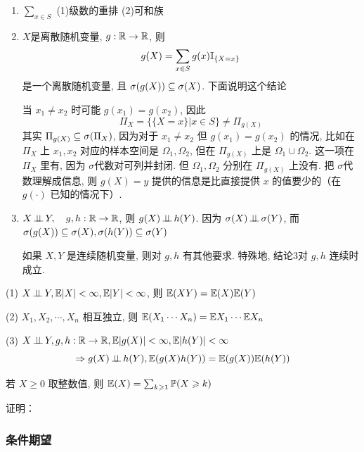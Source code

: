 \begin{remark}
    \quad 

    \begin{enumerate}
        \item $\sum_{x\in S}$ (1)级数的重排 (2)可和族
        \item $X$是离散随机变量, $g:\mathbb{R}\rightarrow\mathbb{R}$, 则 
        \[
        g(X)=\sum_{x\in S}g(x)\mathbb I_{\{X=x\}}
        \]
        是一个离散随机变量, 且 $\sigma(g(X))\subseteq \sigma(X)$. 下面说明这个结论

        当 $x_1\neq x_2$ 时可能 $g(x_1)=g(x_2)$, 因此
        \[
        \Pi_X=\{\{X=x\}|x\in S\}\neq \Pi_{g(X)}
        \]
        其实 $\Pi_{g(X)}\subseteq \sigma(\Pi_X)$, 因为对于 $x_1\neq x_2$ 但 $g(x_1)=g(x_2)$ 的情况, 比如在 $\Pi_X$ 上 $x_1,x_2$ 对应的样本空间是 $\Omega_1,\Omega_2$, 但在 $\Pi_{g(X)}$ 上是 $\Omega_1\cup \Omega_2$. 这一项在 $\Pi_X$ 里有, 因为 $\sigma$代数对可列并封闭. 但 $\Omega_1,\Omega_2$ 分别在 $\Pi_{g(X)}$ 上没有. 把 $\sigma$代数理解成信息, 则 $g(X)=y$ 提供的信息是比直接提供 $x$ 的值要少的（在 $g(\cdot)$ 已知的情况下）. 

        \item $X\operatorname{\perp\!\!\!\perp} Y,\quad g, h:\mathbb{R}\rightarrow \mathbb{R}$, 则 $g(X)\operatorname{\perp\!\!\!\perp} h(Y)$. 因为 $\sigma(X)\operatorname{\perp\!\!\!\perp} \sigma(Y)$, 而 $\sigma(g(X))\subseteq \sigma(X), \sigma(h(Y))\subseteq \sigma(Y)$
        
        如果 $X,Y$ 是连续随机变量, 则对 $g,h$ 有其他要求. 特殊地, 结论3对 $g,h$ 连续时成立. 
    \end{enumerate}
\end{remark}

\begin{theorem}
    (1) $X\operatorname{\perp\!\!\!\perp} Y, \mathbb E|X|<\infty, \mathbb E|Y|<\infty$, 则 $\mathbb E(XY)=\mathbb E(X)\mathbb E(Y)$

    (2) $X_1,X_2,\cdots,X_n$ 相互独立, 则 $\mathbb E(X_1\cdots X_n)=\mathbb E X_1\cdots \mathbb E X_n$

    (3) $X\operatorname{\perp\!\!\!\perp} Y, g,h:\mathbb{R}\rightarrow\mathbb{R}, \mathbb E|g(X)|<\infty, \mathbb E|h(Y)|<\infty$
    \[
    \Rightarrow g(X)\operatorname{\perp\!\!\!\perp} h(Y), \mathbb E(g(X)h(Y))=\mathbb E(g(X))\mathbb E(h(Y))
    \]
\end{theorem}

\begin{theorem}
    若 $X\geq 0$ 取整数值, 则 $\mathbb E (X)=\sum_{k\geqslant 1}\mathbb{P}(X\geqslant k)$
\end{theorem}

证明：

\subsubsection{条件期望}

